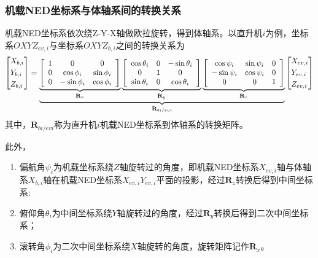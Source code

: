 \subsubsection{机载NED坐标系与体轴系间的转换关系}
机载NED坐标系依次绕Z-Y-X轴做欧拉旋转，得到体轴系。以直升机$i$为例，坐标系$OXYZ_{ev,i}$与坐标系$OXYZ_{b,i}$之间的转换关系为
\begin{equation}
  \left[ \begin{gathered}
    {X_{b,i}} \hfill \\
    {Y_{b,i}} \hfill \\
    {Z_{b,i}} \hfill \\ 
  \end{gathered}  \right] = \underbrace {\underbrace {\left[ {\begin{array}{*{20}{c}}
    1&0&0 \\ 
    0&{\cos {\phi _i}}&{\sin {\phi _i}} \\ 
    0&{ - \sin {\phi _i}}&{\cos {\phi _i}} 
  \end{array}} \right]}_{{{\mathbf{R}}_x}}\underbrace {\left[ {\begin{array}{*{20}{c}}
    {\cos {\theta _i}}&0&{ - \sin {\theta _i}} \\ 
    0&1&0 \\ 
    {\sin {\theta _i}}&0&{\cos {\theta _i}} 
  \end{array}} \right]}_{{{\mathbf{R}}_y}}\underbrace {\left[ {\begin{array}{*{20}{c}}
    {\cos {\psi _i}}&{\sin {\psi _i}}&0 \\ 
    { - \sin {\psi _i}}&{\cos {\psi _i}}&0 \\ 
    0&0&1 
  \end{array}} \right]}_{{{\mathbf{R}}_z}}}_{{{\mathbf{R}}_{bi/evi}}}\left[ \begin{gathered}
    {X_{ev,i}} \hfill \\
    {Y_{ev,i}} \hfill \\
    {Z_{ev,i}} \hfill \\ 
  \end{gathered}  \right]
\end{equation}
其中，$\mathbf{R}_{bi/evi}$称为直升机$i$机载NED坐标系到体轴系的转换矩阵。

此外，
\begin{enumerate}
  \item 偏航角$\psi_i$为机载坐标系绕$Z$轴旋转过的角度，即机载NED坐标系$X_{ev,i}$轴与体轴系$X_{b,i}$轴在机载NED坐标系$X_{ev,i}Y_{ev,i}$平面的投影，经过$\mathbf{R}_z$转换后得到中间坐标系;
  \item 俯仰角$\theta_i$为中间坐标系绕$Y$轴旋转过的角度，经过$\mathbf{R}_y$转换后得到二次中间坐标系；
  \item 滚转角$\phi_i$为二次中间坐标系绕$X$轴旋转的角度，旋转矩阵记作$\mathbf{R}_x$。
\end{enumerate}

